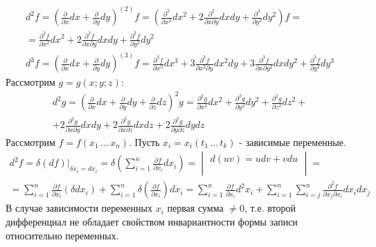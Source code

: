 \documentclass[12pt]{article}
\begin{document}
    \begin{gather*}
            d^2 f=\left(\frac{\partial}{\partial x} d x+\frac{\partial}{\partial y} d y\right)^{(2)} f=\left(\frac{\partial^2}{\partial x^2} d x^2+2 \frac{\partial^2}{\partial x \partial y} d x d y+\frac{\partial^2}{\partial y^2} d y^2\right) f= \\
            = \frac{\partial^2 f}{\partial x^2} d x^2+2 \frac{\partial^2 f}{\partial x \partial y} d x d y+\frac{\partial^2 f}{\partial y^2} d y^2 \\
            d^3 f=\left(\frac{\partial}{\partial x} d x+\frac{\partial}{\partial y} d y\right)^{(3)} f=\frac{\partial^3 f}{\partial x^3} d x^3+3 \frac{\partial^3 f}{\partial x^2 \partial y} d x^2 d y+3 \frac{\partial^3 f}{\partial x \partial y^2} d x d y^2+\frac{\partial^3 f}{\partial y^3} d y^3
    \end{gather*}
    Рассмотрим $g = g(x; y; z)$:
    \begin{gather*}
        d^2 g=\left(\frac{\partial}{\partial x} d x+\frac{\partial}{\partial y} d y+\frac{\partial}{\partial z} d z\right)^2 g=\frac{\partial^2 g}{\partial x^2} d x^2+\frac{\partial^2 g}{\partial y^2} d y^2+\frac{\partial^2 g}{\partial z^2} d z^2+ \\
        +2 \frac{\partial^2 g}{\partial x \partial y} d x d y+2 \frac{\partial^2 g}{\partial x \partial z} d x d z+2 \frac{\partial^2 g}{\partial y \partial z} d y d z
    \end{gather*}
    Рассмотрим $f = f(x_1\, \dots\, x_n)$. Пусть $x_i = x_i(t_1\, \dots\, t_k)$ - зависимые переменные.
    \begin{gather*}
        d^2 f=\delta(d f) \Big|_{\delta x_i=d x_i}=\delta\left(\sum_{i=1}^n \frac{\partial f}{\partial x_i} d x_i\right)=\begin{vmatrix}d(u v)=u d v+v d u\\\\\end{vmatrix} \boxed{=} \\
        \boxed{=} \sum_{i=1}^n \frac{\partial f}{\partial x_i}\left(\delta d x_i\right)+\sum_{i=1}^n \delta\left(\frac{\partial f}{\partial x_i}\right) d x_i=\sum_{i=1}^n \frac{\partial f}{\partial x_i} d^2 x_i+\sum_{i=1}^n \sum_{i=j}^n \frac{\partial^2 f}{\partial x_j \partial x_i} d x_i d x_j
    \end{gather*}
    В случае зависимости переменных $x_i$ первая сумма $\ne 0$, т.е. второй дифференциал не обладает свойством инвариантности формы записи относительно переменных.
\end{document}
